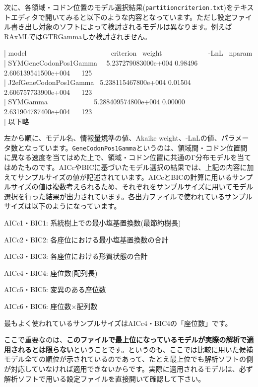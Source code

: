 \documentclass[titlepage,10pt,a4paper]{jsbook}
\newenvironment{content}{\begin{shaded}\vspace{-1em}\raggedright\ttfamily\footnotesize\setlength{\baselineskip}{1.4em}}{\end{shaded}\vspace{-1em}}
\begin{document}
次に、各領域・コドン位置のモデル選択結果(\texttt{partition{\textunderscore}criterion.txt})をテキストエディタで開いてみると以下のような内容となっています。ただし設定ファイル書き出し対象のソフトによって検討されるモデルは異なります。例えばRAxMLではGTR{\textunderscore}Gammaしか検討されません。
\begin{content}
| model~ ~ ~ ~ ~ ~ ~ ~ ~ ~ ~ ~ ~ ~ ~criterion~ weight~ ~ ~ ~ ~ ~ ~ ~ -LnL~ nparam\\
| SYM{\textunderscore}GeneCodonPos1Gamma~ ~5.237279083000e+004 0.98496 2.606139541500e+004~ ~ 125\\
| J2ef{\textunderscore}GeneCodonPos1Gamma~ 5.238115467800e+004 0.01504 2.606757733900e+004~ ~ 123\\
| SYM{\textunderscore}Gamma~ ~ ~ ~ ~ ~ ~ ~ 5.288409574800e+004 0.00000 2.631904787400e+004~ ~ 123\\
| 以下略
\end{content}
左から順に、モデル名、情報量規準の値、Akaike weight、-LnLの値、パラメータ数となっています。\texttt{GeneCodonPos1Gamma}というのは、領域間・コドン位置間に異なる速度を当てはめた上で、領域・コドン位置に共通のΓ分布モデルを当てはめたものです。AICcやBICに基づいたモデル選択の結果では、上記の内容に加えてサンプルサイズの値が記述されています。AICcとBICの計算に用いるサンプルサイズの値は複数考えられるため、それぞれをサンプルサイズに用いてモデル選択を行った結果が出力されています。各出力ファイルで使われているサンプルサイズは以下のようになっています。
\begin{list}{}{}\small\setlength{\baselineskip}{1.1em}
\item[AICc1・BIC1:] 系統樹上での最小塩基置換数(最節約樹長)
\item[AICc2・BIC2:] 各座位における最小塩基置換数の合計
\item[AICc3・BIC3:] 各座位における形質状態の合計
\item[AICc4・BIC4:] 座位数(配列長)
\item[AICc5・BIC5:] 変異のある座位数
\item[AICc6・BIC6:] 座位数×配列数
\end{list}
最もよく使われているサンプルサイズはAICc4・BIC4の「座位数」です。

ここで重要なのは、\textbf{このファイルで最上位になっているモデルが実際の解析で適用されるとは限らない}ということです。というのも、ここでは比較に用いた候補モデル全ての順位が示されているのであって、たとえ最上位でも解析ソフトの側が対応していなければ適用できないからです。実際に適用されるモデルは、必ず解析ソフトで用いる設定ファイルを直接開いて確認して下さい。
\end{document}
